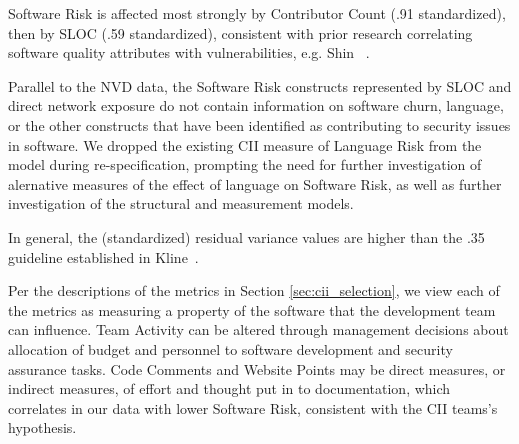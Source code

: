 Software Risk is affected most strongly by Contributor Count (.91 standardized), then by SLOC (.59 standardized), consistent with prior research correlating software quality attributes with vulnerabilities, e.g. Shin ~\cite{shin2011evaluating}.

Parallel to the NVD data, the Software Risk constructs represented by SLOC and direct network exposure do not contain information on software churn, language, or the other constructs that have been identified as contributing to security issues in software. We dropped the existing CII measure of Language Risk from the model during re-specification, prompting the need for further investigation of alernative measures of the effect of language on Software Risk, as well as further investigation of the structural and measurement models. 

In general, the (standardized) residual variance values are higher than the .35 guideline established in Kline~\cite{kline2015principles}.

Per the descriptions of the metrics in Section \ref{sec:cii_selection}, we view each of the metrics as measuring a property of the software that the development team can influence.
Team Activity can be altered through management decisions about allocation of budget and personnel to software development and security assurance tasks. Code Comments and Website Points may be direct measures, or indirect measures, of effort and thought put in to documentation, which correlates in our data with lower Software Risk, consistent with the CII teams's hypothesis. 